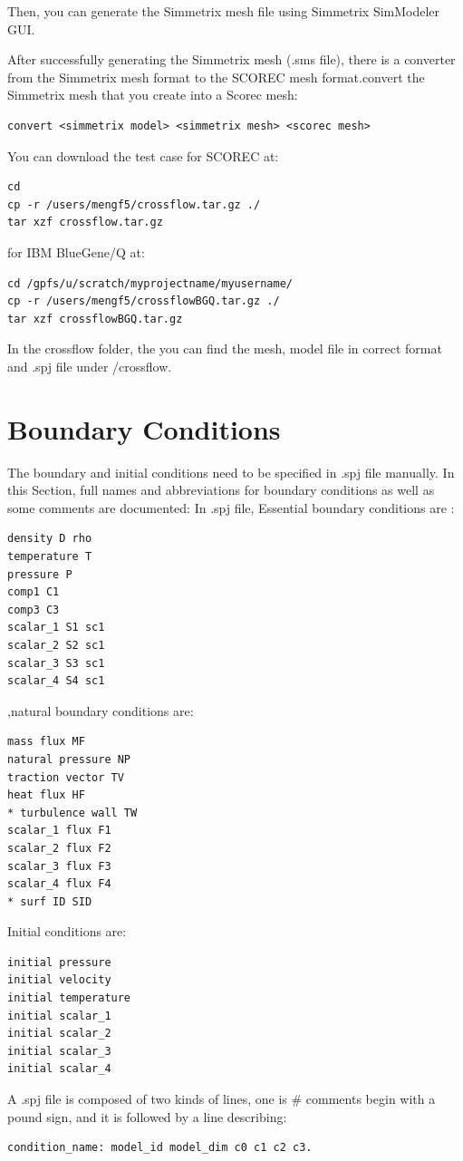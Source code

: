 \documentclass{article}
\begin{document}
Then, you can generate the Simmetrix mesh file using Simmetrix SimModeler GUI.

After successfully generating the Simmetrix mesh (.sms file), there is a converter from the Simmetrix mesh format to the SCOREC mesh format.convert the Simmetrix mesh that you create into a Scorec mesh:
\begin{lstlisting}
convert <simmetrix model> <simmetrix mesh> <scorec mesh>
\end{lstlisting}

You can download the test case for SCOREC at:
\begin{lstlisting}
cd
cp -r /users/mengf5/crossflow.tar.gz ./
tar xzf crossflow.tar.gz
\end{lstlisting}
for IBM BlueGene/Q at:
\begin{lstlisting}
cd /gpfs/u/scratch/myprojectname/myusername/
cp -r /users/mengf5/crossflowBGQ.tar.gz ./
tar xzf crossflowBGQ.tar.gz
\end{lstlisting}
In the crossflow folder, the you can find the mesh, model file in correct format and .spj file under /crossflow.

\section{Boundary Conditions}
\label{ch:4}
The boundary and initial conditions need to be specified in .spj file manually. In this Section, full names and abbreviations for boundary conditions as well as some comments are documented:
In .spj file, Essential boundary conditions are :
\begin{lstlisting}
density D rho
temperature T
pressure P
comp1 C1
comp3 C3
scalar_1 S1 sc1
scalar_2 S2 sc1
scalar_3 S3 sc1
scalar_4 S4 sc1
\end{lstlisting}
,natural boundary conditions are:
\begin{lstlisting}
mass flux MF
natural pressure NP
traction vector TV
heat flux HF
* turbulence wall TW
scalar_1 flux F1
scalar_2 flux F2
scalar_3 flux F3
scalar_4 flux F4
* surf ID SID
\end{lstlisting}
Initial conditions are:
\begin{lstlisting}
initial pressure
initial velocity
initial temperature
initial scalar_1
initial scalar_2
initial scalar_3
initial scalar_4
\end{lstlisting}
A .spj file is composed of two kinds of lines, one is $\#$ comments begin with a pound sign, and it is followed by a line describing: 
\begin{lstlisting}
condition_name: model_id model_dim c0 c1 c2 c3. 
\end{lstlisting}
\end{document}
